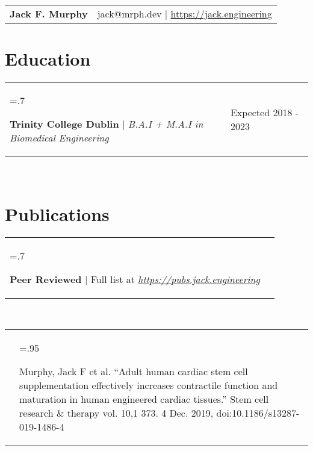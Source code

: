 \documentclass[letterpaper,11pt]{article}
\newcommand{\projHeadings}[2]{
    \begin{tabularx}{\textwidth} {>{\hsize=.7\textwidth\raggedright\arraybackslash}X 
   >{\raggedleft\arraybackslash}X}
      #1 & \small#2 \\
    \end{tabularx}
    \\
}
\newcommand{\projitems}[1]{
    \begin{tabularx}{\textwidth} {>{\raggedleft\arraybackslash}X | >{\hsize=.95\textwidth\raggedright\arraybackslash}X}
      & \small#1 \\
    \end{tabularx}
     \\
}
\newcommand{\heading}[3]{
    \hspace{-9mm}
    \begin{tabular}{p{.4\textwidth} >{\raggedleft}p{.57\textwidth}}
        \textbf{\Huge{#1}}\vspace{5mm} & #2 $|$ #3 \\
    \end{tabular}
}
\begin{document}
\heading
    {Jack F. Murphy}
    {jack@mrph.dev}
    {\href{https://jack.engineering}{https://jack.engineering}}

\section*{Education}
    \projHeadings
          {\textbf{Trinity College Dublin} $|$ \emph{B.A.I + M.A.I in Biomedical Engineering}}
          {Expected 2018 - 2023}
          {}

\section*{Publications}
    \projHeadings
          {\textbf{Peer Reviewed} $|$ Full list at \emph{\href{https://pubs.jack.engineering}{https://pubs.jack.engineering}}}
          {}
         \projitems
            {Murphy, Jack F et al. “Adult human cardiac stem cell supplementation effectively increases contractile function and maturation in human engineered cardiac tissues.” Stem cell research \& therapy vol. 10,1 373. 4 Dec. 2019, doi:10.1186/s13287-019-1486-4}

\end{document}
